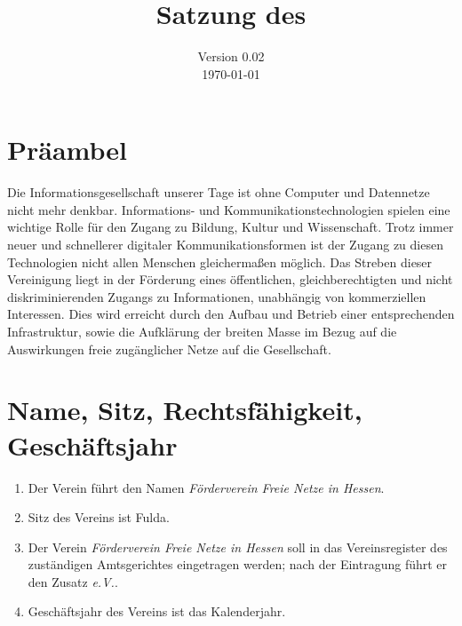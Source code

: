 \documentclass[ngerman]{article}
\title{Satzung des\\
\emph{\NameVerein}}
\date{Version 0.02\\
\today}
\newcommand{\NameVerein}{Förderverein Freie Netze in Hessen}
\begin{document}
\maketitle

\thispagestyle{empty}
\pagebreak

\section{Präambel}
Die Informationsgesellschaft unserer Tage ist ohne Computer und Datennetze nicht mehr denkbar. Informations- und Kommunikationstechnologien spielen eine wichtige Rolle für den Zugang zu Bildung, Kultur und Wissenschaft. Trotz immer neuer und schnellerer digitaler Kommunikationsformen ist der Zugang zu diesen Technologien nicht allen Menschen gleichermaßen möglich. Das Streben dieser Vereinigung liegt in der Förderung eines öffentlichen, gleichberechtigten und nicht diskriminierenden Zugangs zu Informationen, unabhängig von kommerziellen Interessen. Dies wird erreicht durch den Aufbau und Betrieb einer entsprechenden Infrastruktur, sowie die Aufklärung der breiten Masse im Bezug auf die Auswirkungen freie zugänglicher Netze auf die Gesellschaft.


\section{Name, Sitz, Rechtsfähigkeit, Geschäftsjahr}
\begin{enumerate}
  \item Der Verein führt den Namen \emph{\NameVerein}.
  \item Sitz des Vereins ist Fulda.
  \item Der Verein \emph{\NameVerein} soll in das Vereinsregister des zuständigen Amtsgerichtes eingetragen werden; nach der Eintragung führt er den Zusatz \emph{e.V.}.
  \item Geschäftsjahr des Vereins ist das Kalenderjahr.
\end{enumerate}
\end{document}
